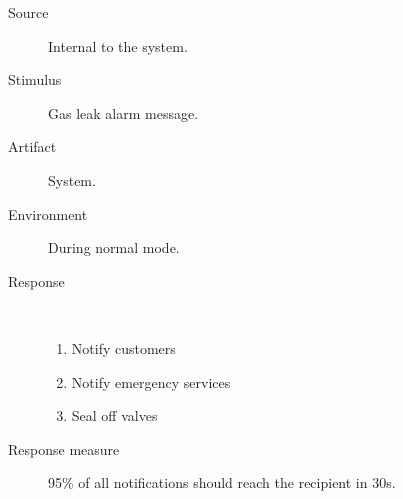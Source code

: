 \begin{description}
	\item[Source] Internal to the system.
	\item[Stimulus] Gas leak alarm message.
	\item[Artifact] System.
	\item[Environment] During normal mode.
	\item[Response] \
		\begin{enumerate}
		  \item Notify customers
		  \item Notify emergency services
		  \item Seal off valves
		\end{enumerate}
	\item[Response measure] 95\% of all notifications should reach the recipient
	in 30s. 
\end{description}